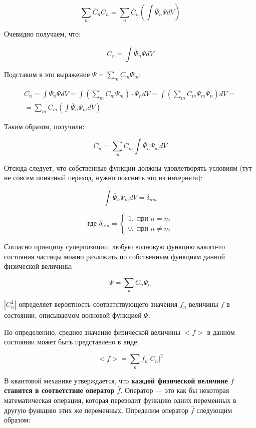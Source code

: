 \documentclass[a4paper,14pt]{article}
\begin{document}
\[\sum\limits_n \overline C_n C_n = \sum\limits_n \overline C_n \left(\int\overline\Psi_n \Psi dV\right)\]

Очевидно получаем, что:

\[C_n = \int\overline\Psi_n \Psi dV\]

Подставим в это выражение $\Psi = \sum\limits_m C_m \Psi_m$:

\begin{gather*}
	C_n = \int \overline\Psi_n \Psi dV = \int \left(\sum\limits_m C_m \Psi_m\right) \cdot \overline\Psi_n dV = \int \left(\sum\limits_m C_m \Psi_m \overline\Psi_n\right)dV = \\
	= \sum\limits_m C_m \left(\int \overline\Psi_n \Psi_m dV\right)
\end{gather*}

Таким образом, получили:

\[C_n = \sum\limits_m C_m \int \overline\Psi_n \Psi_m dV\]

Отсюда следует, что собственные функции должны удовлетворять условиям (тут не совсем понятный переход, нужно пояснить это из интернета):

\[\int \overline\Psi_n \Psi_m dV = \delta_{nm}\]

\begin{equation*}
\text{где } \delta_{nm} = 
\begin{cases}
1, \text{ при } n=m \\
0, \text{ при } n \ne m
\end{cases}
\end{equation*}

Согласно принципу суперпозиции, любую волновую функцию какого-то состояния частицы можно разложить по собственным функциям данной физической величины:

\[\Psi = \sum\limits_n C_n \Psi_n\]

$|C_n^2|$ определяет вероятность соответствующего значения $f_n$ величины $f$ в состоянии, описываемом волновой функцией $\Psi$.

По определению, среднее значение физической величины $<f>$ в данном состоянии может быть представлено в виде:

\[<f>=\sum\limits_n f_n |C_n|^2\]

В квантовой механике утверждается, что \textbf{каждой физической величине $f$ ставится в соответствие оператор $\hat f$}. Оператор --- это как бы некоторая математическая операция, которая переводит функцию одних переменных в другую функцию этих же переменных. Определим оператор $\hat f$ следующим образом:
\end{document}
